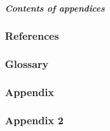 \documentclass[%
aspectratio=169,%
xcolor=table,%
]{beamer}
\begin{document}

	\begin{frame}[%
		endframe,
	]%
		\myendcontent
	\end{frame}


	\backupbegin

	\part{}
	\begin{frame}
		\frametitle{Contents of appendices}
		\tableofcontents
	\end{frame}

	\section{References}
	

	\section{Glossary}
	
	\section{Appendix}
	
	\section{Appendix 2}
	

	\backupend
 
\end{document}
